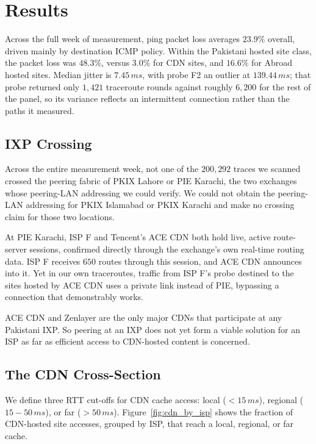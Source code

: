 \documentclass[sigconf,anonymous,10pt]{acmart}
\begin{document}
\section{Results}
\label{sec:results}

Across the full week of measurement, ping packet loss averages $23.9\%$ overall, driven mainly by destination ICMP policy. Within the Pakistani hosted site class, the packet loss was $48.3\%$, versus $3.0\%$ for CDN sites, and $16.6\%$ for Abroad hosted sites. Median jitter is $7.45\,ms$, with probe F2 an outlier at $139.44\,ms$; that probe returned only $1{,}421$ traceroute rounds against roughly $6{,}200$ for the rest of the panel, so its variance reflects an intermittent connection rather than the paths it measured.


\subsection{IXP Crossing }
\label{sec:rq1}

Across the entire measurement week, not one of the $200,292$ traces we scanned crossed the peering fabric of PKIX Lahore or PIE Karachi, the two exchanges whose peering-LAN addressing we could verify. We could not obtain the peering-LAN addressing for PKIX Islamabad or PKIX Karachi and make no crossing claim for those two locations.

At PIE Karachi, ISP F and Tencent's ACE CDN both hold live, active route-server sessions, confirmed directly through the exchange's own real-time routing data. ISP F receives $650$ routes through this session, and ACE CDN announces into it. Yet in our own traceroutes, traffic from ISP F's probe destined to the sites hosted by ACE CDN uses a private link instead of PIE, bypassing a connection that demonstrably works.

ACE CDN and Zenlayer are the only major CDNs that participate at any Pakistani IXP. So peering at an IXP does not yet form a viable solution for an ISP as far as efficient access to CDN-hosted content is concerned.

\subsection{The CDN Cross-Section}
\label{sec:prelim-cdn}
We define three RTT cut-offs for CDN cache access: local ($<15\,ms$), regional ($15-50\,ms$), or far ($>50\,ms$).
Figure~\ref{fig:cdn_by_isp} shows the fraction of CDN-hosted site accesses, grouped by ISP, that reach a local, regional, or far cache.
\end{document}
